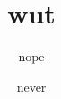 \documentclass{article}
\title{wut}
\author{nope}
\date{never}
\numberwithin{equation}{section}
\begin{document}
\nocite{*}


\end{document}
